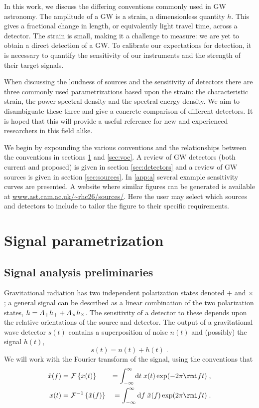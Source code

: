 In this work, we discuss the differing conventions commonly used in GW astronomy. The amplitude of a GW is a strain, a dimensionless quantity $h$. This gives a fractional change in length, or equivalently light travel time, across a detector. The strain is small, making it a challenge to measure: we are yet to obtain a direct detection
of a GW. To calibrate our expectations for detection, it is necessary to quantify the sensitivity of our instruments and the strength of their target signals.

When discussing the loudness of sources and the sensitivity of detectors there are three commonly used parametrizations based upon the strain: the characteristic strain, the power spectral density and the spectral energy density. We aim to disambiguate these three and give a concrete comparison of different detectors. It is hoped that this will provide a useful reference for new and experienced researchers in this field alike. 

We begin by expounding the various conventions and the relationships between the conventions in sections \ref{sec:conventions} and \ref{sec:voc}. A review of GW detectors (both current and proposed) is given in section \ref{sec:detectors} and a review of GW sources is given in section \ref{sec:sources}. In \ref{app:a} several example sensitivity curves are presented. A website where similar figures can be generated is available at \url{www.ast.cam.ac.uk/~rhc26/sources/}. Here the user may select which sources and detectors to include to tailor the figure to their specific requirements.


\section{Signal parametrization}\label{sec:conventions}

\subsection{Signal analysis preliminaries}

Gravitational radiation has two independent polarization states denoted $+$ and $\times$; a general signal can be described as a linear combination of the two polarization states, $h \nobreak=\nobreak A_{+} h_{+}\nobreak +\nobreak A_{\times} h_{\times}$. The sensitivity of a detector to these depends upon the relative orientations of the source and detector. The output of a gravitational wave detector $s(t)$ contains a superposition of noise $n(t)$ and (possibly) the signal $h(t)$,
\begin{equation}
s(t) = n(t)+h(t) \; .
\end{equation}
We will work with the Fourier transform of the signal, using the conventions that
\begin{eqnarray} 
\tilde{x}(f) &= {\mathcal{F}}\left\{x(t)\right\} &= \int_{-\infty}^{\infty}\mathrm{d}t\;x(t)\exp (-2\pi \rmi f t ) \; , \\
x(t) &= {\mathcal{F}}^{-1}\left\{\tilde{x}(f)\right\} &= \int_{-\infty}^{\infty}\mathrm{d}f\;\tilde{x}(f)\exp (2\pi \rmi f t ) \; .
\end{eqnarray}

